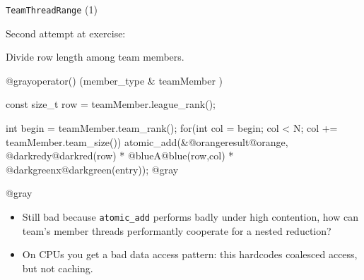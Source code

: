 \iffull
\begin{frame}[fragile]{\texttt{TeamThreadRange} (1)}


  Second attempt at exercise:

\vspace{10pt}
  Divide row length among team members.

  \begin{code}
@grayoperator() (member_type & teamMember ) {
  const size_t row = teamMember.league_rank();

  int begin = teamMember.team_rank();
  for(int col = begin; col < N; col += teamMember.team_size()) {
    atomic_add(&@orangeresult@orange, @darkredy@darkred(row) * @blueA@blue(row,col) * @darkgreenx@darkgreen(entry));
  }
@gray}@gray
  \end{code}

  \pause
  \vspace{-5pt}

  \begin{itemize}

  \item {Still bad because \texttt{atomic\_add} performs badly under high contention, how can team's member threads performantly cooperate for a nested reduction?}

  \item {On CPUs you get a bad data access pattern: this hardcodes coalesced access, but not caching.}

  \end{itemize}

\end{frame}
\fi


